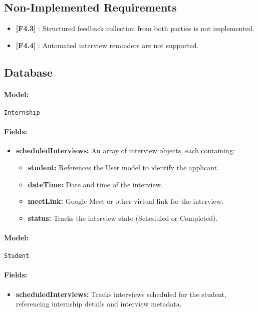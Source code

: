 \subsection*{Non-Implemented Requirements}
\begin{itemize}
    \item \textbf{[F4.3]} : Structured feedback collection from both parties is not implemented.
    \item \textbf{[F4.4]} : Automated interview reminders are not supported.
\end{itemize}

\subsection*{Database}
\paragraph{Model:} \texttt{Internship}
\paragraph{Fields:}
\begin{itemize}
    \item \textbf{scheduledInterviews:} An array of interview objects, each containing:
    \begin{itemize}
        \item \textbf{student:} References the User model to identify the applicant.
        \item \textbf{dateTime:} Date and time of the interview.
        \item \textbf{meetLink:} Google Meet or other virtual link for the interview.
        \item \textbf{status:} Tracks the interview state (Scheduled or Completed).
    \end{itemize}
\end{itemize}

\paragraph{Model:} \texttt{Student}
\paragraph{Fields:}
\begin{itemize}
    \item \textbf{scheduledInterviews:} Tracks interviews scheduled for the student, referencing internship details and interview metadata.
\end{itemize}

